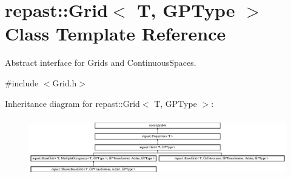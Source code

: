 \hypertarget{classrepast_1_1_grid}{\section{repast\-:\-:Grid$<$ T, G\-P\-Type $>$ Class Template Reference}
\label{classrepast_1_1_grid}
}


Abstract interface for Grids and Continuous\-Spaces.  




{\ttfamily \#include $<$Grid.\-h$>$}

Inheritance diagram for repast\-:\-:Grid$<$ T, G\-P\-Type $>$\-:\begin{figure}[H]
\begin{center}
\leavevmode
\includegraphics[height=2.587800cm]{classrepast_1_1_grid}
\end{center}
\end{figure}
